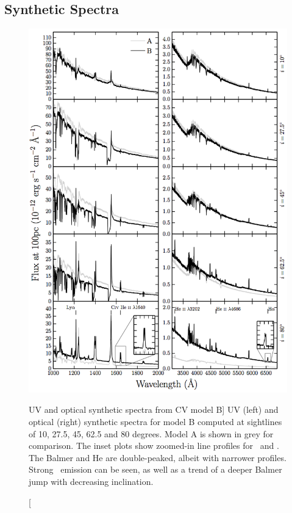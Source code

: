 \subsection{Synthetic Spectra}
\label{sec:modelb_spectra}
\begin{figure}
\includegraphics[width=1.0\textwidth]{figures/05-cvpaper/modelb_uv_opt.png}
\caption
[UV and optical synthetic spectra from CV model B]{
UV (left) and optical (right) synthetic spectra for model B computed at
sightlines of 10, 27.5, 45, 62.5 and 80 degrees. 
Model A is shown in grey for comparison.	
The inset plots show zoomed-in line profiles for 
\heiiuv\ and \ha. The Balmer and He
are double-peaked, albeit with narrower profiles.
Strong \heiiopt\ emission can be seen, as well as a trend
of a deeper Balmer jump with decreasing inclination.
}
\label{uvoptb}
\end{figure}

